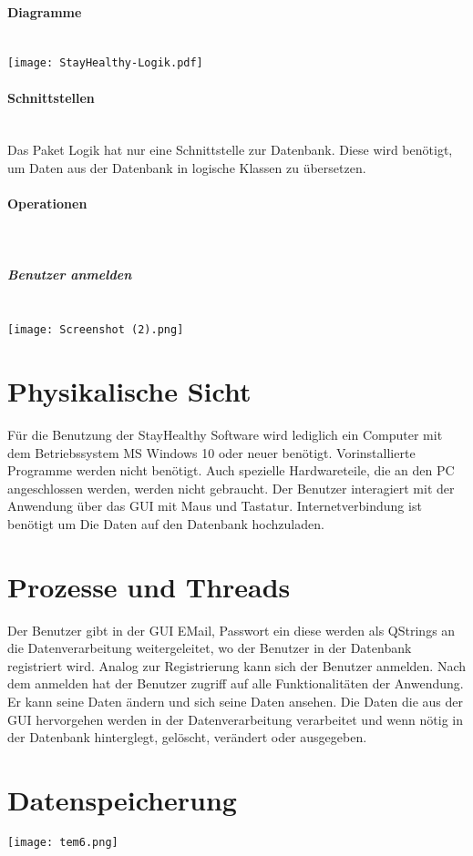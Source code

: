 \documentclass[12pt,a4paper,onecolumn]{article}
\begin{document}
\paragraph{Diagramme}\mbox{}\\
\texttt{[image: StayHealthy-Logik.pdf]}

\paragraph{Schnittstellen}\mbox{}\\
Das Paket Logik hat nur eine Schnittstelle zur Datenbank. Diese wird benötigt, um Daten aus der Datenbank in logische Klassen zu übersetzen.
\paragraph{Operationen}\mbox{}\\
\subparagraph{Benutzer anmelden}\mbox{}\\
\texttt{[image: Screenshot (2).png]}

\section{Physikalische Sicht}
Für die Benutzung der StayHealthy Software wird lediglich ein Computer mit dem Betriebssystem MS Windows 10 oder neuer benötigt. Vorinstallierte Programme werden nicht benötigt. Auch spezielle Hardwareteile, die an den PC angeschlossen werden, werden nicht gebraucht. Der Benutzer interagiert mit der Anwendung über das GUI mit Maus und Tastatur. Internetverbindung ist benötigt um Die Daten auf den Datenbank hochzuladen.

\section{Prozesse und Threads}
Der Benutzer gibt in der GUI EMail, Passwort ein diese werden als QStrings an die Datenverarbeitung weitergeleitet, wo der Benutzer in der Datenbank registriert wird. Analog zur Registrierung kann sich der Benutzer anmelden. Nach dem anmelden hat der Benutzer zugriff auf alle Funktionalitäten der Anwendung. Er kann seine Daten ändern und sich seine Daten ansehen.
Die Daten die aus der GUI hervorgehen werden in der Datenverarbeitung verarbeitet und wenn nötig in der Datenbank hinterglegt, gelöscht, verändert oder ausgegeben.

\section{Datenspeicherung}
\texttt{[image: tem6.png]}
\end{document}
